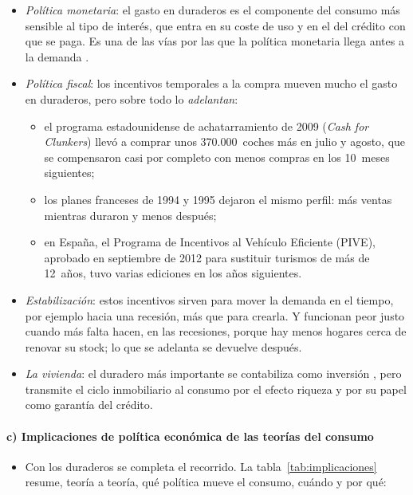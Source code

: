 \documentclass[11pt]{article}
\begin{document}
\begin{itemize}
\item \emph{Política monetaria}: el gasto en duraderos es el componente del consumo más sensible al tipo de interés, que entra en su coste de uso y en el del crédito con que se paga. Es una de las vías por las que la política monetaria llega antes a la demanda .
\item \emph{Política fiscal}: los incentivos temporales a la compra mueven mucho el gasto en duraderos, pero sobre todo lo \emph{adelantan}:
  \begin{itemize}
  \item el programa estadounidense de achatarramiento de 2009 (\emph{Cash for Clunkers}) llevó a comprar unos 370.000~coches más en julio y agosto, que se compensaron casi por completo con menos compras en los 10~meses siguientes\nocite{MianSufi2012Effects};
  \item los planes franceses de 1994 y 1995 dejaron el mismo perfil: más ventas mientras duraron y menos después\nocite{AddaCooper2000};
  \item en España, el Programa de Incentivos al Vehículo Eficiente (PIVE), aprobado en septiembre de 2012 para sustituir turismos de más de 12~años, tuvo varias ediciones en los años siguientes\nocite{IDAE2012PIVE}.
  \end{itemize}
\item \emph{Estabilización}: estos incentivos sirven para mover la demanda en el tiempo, por ejemplo hacia una recesión, más que para crearla. Y funcionan peor justo cuando más falta hacen, en las recesiones, porque hay menos hogares cerca de renovar su stock\nocite{BergerVavra2015}; lo que se adelanta se devuelve después.
\item \emph{La vivienda}: el duradero más importante se contabiliza como inversión , pero transmite el ciclo inmobiliario al consumo por el efecto riqueza\nocite{Bover2005Wealth} y por su papel como garantía del crédito.
\end{itemize}

\paragraph{c) Implicaciones de política económica de las teorías del consumo}

\begin{itemize}
\item Con los duraderos se completa el recorrido. La tabla~\ref{tab:implicaciones} resume, teoría a teoría, qué política mueve el consumo, cuándo y por qué:
\end{itemize}
\end{document}

